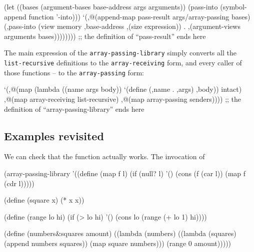 \begin{Snippet}
           (let ((bases (argument-bases base-address
                                         args
                                         arguments))
                 (pass-into (symbol-append function '-into)))
	       `(,@(append-map pass-result
                              args/array-passing
                              bases)
	         (,pass-into (view memory
                                   ,base-address
                                   ,(size expression))
		     . ,(argument-views arguments bases))))))))
        ;; the definition of ``pass-result'' ends here
\end{Snippet}

The main expression of the \texttt{array\--passing\--library}
simply converts all the \texttt{list-recursive} definitions
to the \texttt{array-receiving} form, and every caller of
those functions -- to the \texttt{array-passing} form:

\begin{Snippet}
    `(,@(map (lambda ((name args body))
	       `(define (,name . ,args) ,body))
	     intact)
      ,@(map array-receiving list-recursive)
      ,@(map array-passing senders))))
  ;; the definition of ``array-passing-library'' ends here
\end{Snippet}

\subsection{Examples revisited}

We can check that the function actually works. The invocation
of

\begin{Snippet}
(array-passing-library
 '((define (map f l)
     (if (null? l)
	 '()
	 (cons (f (car l))
	       (map f (cdr l)))))
\end{Snippet}
\begin{Snippet}
   (define (square x)
     (* x x))
\end{Snippet}
\begin{Snippet}
   (define (range lo hi)
     (if (> lo hi)
	 '()
	 (cons lo (range (+ lo 1) hi))))
\end{Snippet}
\begin{Snippet}
   (define (numbers&squares amount)
      ((lambda (numbers)
	 ((lambda (squares)
	    (append numbers squares))
	  (map square numbers)))
       (range 0 amount)))))
\end{Snippet}

